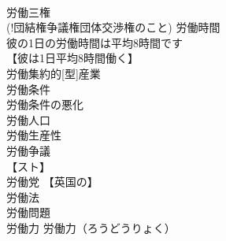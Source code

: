 \documentclass[8pt]{extreport}
\begin{document}
\begin{CJK}{UTF8}{min}
\\	労働三権 
\\	(!団結権争議権団体交渉権のこと) 労働時間 
\\	彼の1日の労働時間は平均8時間です 
\\	【彼は1日平均8時間働く】
\\	労働集約的[型]産業 
\\	労働条件 
\\	労働条件の悪化 
\\	労働人口 
\\	労働生産性 
\\	労働争議 
\\	【スト】
\\	労働党 【英国の】
\\	労働法 
\\	労働問題 
\\	労働力		労働力（ろうどうりょく） 
\end{CJK}
\end{document}

